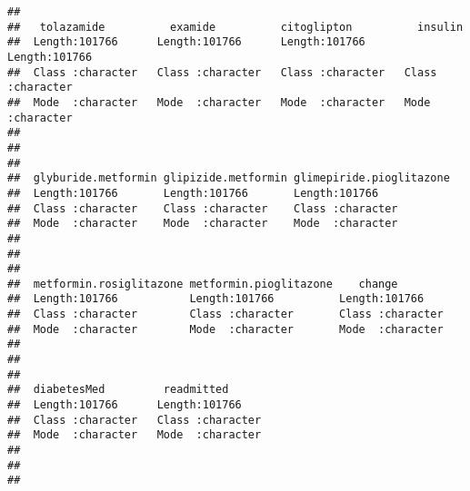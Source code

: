 \documentclass[
]{article}
\begin{document}
\begin{verbatim}
##                                                                             
##   tolazamide          examide          citoglipton          insulin         
##  Length:101766      Length:101766      Length:101766      Length:101766     
##  Class :character   Class :character   Class :character   Class :character  
##  Mode  :character   Mode  :character   Mode  :character   Mode  :character  
##                                                                             
##                                                                             
##                                                                             
##  glyburide.metformin glipizide.metformin glimepiride.pioglitazone
##  Length:101766       Length:101766       Length:101766           
##  Class :character    Class :character    Class :character        
##  Mode  :character    Mode  :character    Mode  :character        
##                                                                  
##                                                                  
##                                                                  
##  metformin.rosiglitazone metformin.pioglitazone    change         
##  Length:101766           Length:101766          Length:101766     
##  Class :character        Class :character       Class :character  
##  Mode  :character        Mode  :character       Mode  :character  
##                                                                   
##                                                                   
##                                                                   
##  diabetesMed         readmitted       
##  Length:101766      Length:101766     
##  Class :character   Class :character  
##  Mode  :character   Mode  :character  
##                                       
##                                       
## 
\end{verbatim}
\end{document}
